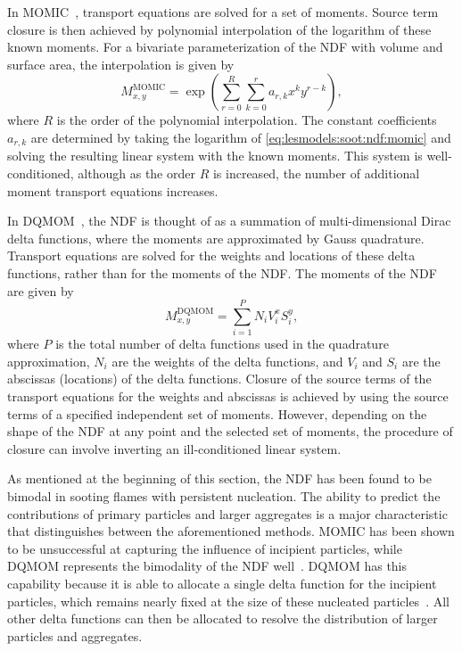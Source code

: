 In MOMIC~\cite{frenklach2002,frenklach1987,frenklach1994}, transport equations are solved for a set of moments. Source term closure is then achieved by polynomial interpolation of the logarithm of these known moments. For a bivariate parameterization of the NDF with volume and surface area, the interpolation is given by
\begin{equation}\label{eq:lesmodels:soot:ndf:momic}
  M_{x,y}^{\text{MOMIC}} = \exp\left( \sum\limits_{r=0}^{R} \sum\limits_{k=0}^{r} a_{r,k}x^k y^{r-k} \right),
\end{equation}
where $R$ is the order of the polynomial interpolation. The constant coefficients $a_{r,k}$ are determined by taking the logarithm of \cref{eq:lesmodels:soot:ndf:momic} and solving the resulting linear system with the known moments. This system is well-conditioned, although as the order $R$ is increased, the number of additional moment transport equations increases.

In DQMOM~\cite{marchisio2005}, the NDF is thought of as a summation of multi-dimensional Dirac delta functions, where the moments are approximated by Gauss quadrature. Transport equations are solved for the weights and locations of these delta functions, rather than for the moments of the NDF. The moments of the NDF are given by
\begin{equation}\label{eq:lesmodels:soot:ndf:dqmom}
  M_{x,y}^{\text{DQMOM}} = \sum\limits_{i=1}^{P} N_i V_i^x S_i^y,
\end{equation}
where $P$ is the total number of delta functions used in the quadrature approximation, $N_i$ are the weights of the delta functions, and $V_i$ and $S_i$ are the abscissas (locations) of the delta functions. Closure of the source terms of the transport equations for the weights and abscissas is achieved by using the source terms of a specified independent set of moments. However, depending on the shape of the NDF at any point and the selected set of moments, the procedure of closure can involve inverting an ill-conditioned linear system.

As mentioned at the beginning of this section, the NDF has been found to be bimodal in sooting flames with persistent nucleation. The ability to predict the contributions of primary particles and larger aggregates is a major characteristic that distinguishes between the aforementioned methods. MOMIC has been shown to be unsuccessful at capturing the influence of incipient particles, while DQMOM represents the bimodality of the NDF well~\cite{mueller2009}. DQMOM has this capability because it is able to allocate a single delta function for the incipient particles, which remains nearly fixed at the size of these nucleated particles~\cite{blanquart2009}. All other delta functions can then be allocated to resolve the distribution of larger particles and aggregates.

